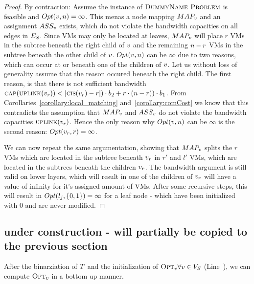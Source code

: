 \begin{proof}
By contraction: Assume the instance of $\textsc{DummyName Problem}$ is feasible and 
$Opt(v,n) = \infty$. This menas a node mapping $MAP_v$ 
and an assignment $ASS_v$ exists, which do not violate the 
bandwidth capacities on all edges in $E_S$. Since VMs may only be 
located at leaves, $MAP_v$ will place $r$ VMs in the subtree beneath the 
right child of $v$ and the remaining $n - r$ VMs in the subtree 
beneath the other child of $v$. 
$Opt(v,n)$ can be $\infty$ due to two reasons, which can occur 
at or beneath one of the children of $v$. Let us without loss of 
generality assume that the reason occured beneath the right child. The first 
reason, is that there is not sufficient bandwidth  
$\textsc{cap}(\textsc{uplink}(v_r)) < |\textsc{cis}(v_{r}) - r|) 
\cdot b_2 + r \cdot (n - r)) \cdot b_1$. From 
Corollaries~\ref{corollary:local_matching} and~\ref{corollary:comCost} we know 
that this contradicts the assumption that $MAP_v$ 
and $ASS_v$ do not violate the bandwidth capacities 
$\textsc{uplink}(v_r)$. Hence the only reason why 
$Opt(v,n)$ can be $\infty$ is the second reason: 
$Opt(v_r, r) = \infty$. 

We can now repeat the same argumentation, showing that $MAP_v$ splits 
the $r$ VMs which are located in the subtree beneath $v_r$ in $r'$ 
and $l'$ VMs, which are located in the subtrees beneath the 
children $v_r$. The bandwidth argument is still valid on lower 
layers, which will result in one of the children of $v_r$ will 
have a value of infinity for it's assigned amount of VMs. After some 
recursive steps, this will result in $Opt(l_j, \{0,1\}) = \infty$ 
for a leaf node - which have been initialized with $0$ and 
are never modified.
\end{proof}



\subsection{under construction - will partially be copied to the previous 
section}

After the binarziation of $T$ and the initialization of 
$\textsc{Opt}_{v} \forall v \in V_S$ 
(Line~), we can compute $\textsc{Opt}_{v}$ in a bottom up 
manner. 

